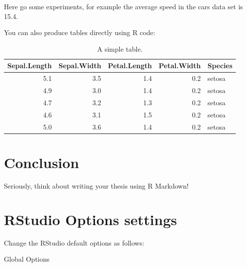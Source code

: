 \documentclass[
]{scrartcl}
\begin{document}
Here go some experiments, for example the average speed in the cars data set is 15.4.

You can also produce tables directly using R code:

\begin{longtable}[t]{rrrrl}
\caption{\label{tab:tables-mtcars}A simple table.}\\
\toprule
Sepal.Length & Sepal.Width & Petal.Length & Petal.Width & Species\\
\midrule
5.1 & 3.5 & 1.4 & 0.2 & setosa\\
4.9 & 3.0 & 1.4 & 0.2 & setosa\\
4.7 & 3.2 & 1.3 & 0.2 & setosa\\
4.6 & 3.1 & 1.5 & 0.2 & setosa\\
5.0 & 3.6 & 1.4 & 0.2 & setosa\\
\bottomrule
\end{longtable}

\hypertarget{sec:conclusion}{%
\section{Conclusion}\label{sec:conclusion}}

Seriously, think about writing your thesis using R Markdown!

\newpage


\hypertarget{appendix-appendix}{%
\appendix}


\hypertarget{sec:appA}{%
\section{RStudio Options settings}\label{sec:appA}}

Change the RStudio default options as follows:

Global Options
\end{document}
